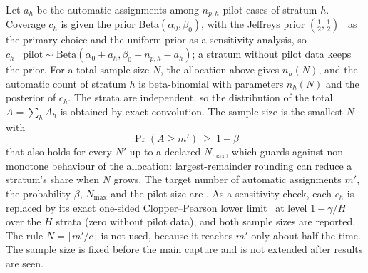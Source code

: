 Let $a_h$ be the automatic assignments among $n_{p,h}$ pilot cases of stratum $h$. Coverage $c_h$ is given the prior Beta$(\alpha_0,\beta_0)$, with the Jeffreys prior $(\tfrac12,\tfrac12)$~\cite{jeffreys1946} as the primary choice and the uniform prior as a sensitivity analysis, so $c_h\mid\text{pilot}\sim\text{Beta}(\alpha_0+a_h,\beta_0+n_{p,h}-a_h)$; a stratum without pilot data keeps the prior. For a total sample size $N$, the allocation above gives $n_h(N)$, and the automatic count of stratum $h$ is beta-binomial with parameters $n_h(N)$ and the posterior of $c_h$. The strata are independent, so the distribution of the total $A=\sum_h A_h$ is obtained by exact convolution. The sample size is the smallest $N$ with
\[
\Pr(A\ge m')\ \ge\ 1-\beta
\]
that also holds for every $N'$ up to a declared $N_{\max}$, which guards against non-monotone behaviour of the allocation: largest-remainder rounding can reduce a stratum's share when $N$ grows. The target number of automatic assignments $m'$, the probability $\beta$, $N_{\max}$ and the pilot size are . As a sensitivity check, each $c_h$ is replaced by its exact one-sided Clopper--Pearson lower limit~\cite{clopper1934} at level $1-\gamma/H$ over the $H$ strata (zero without pilot data), and both sample sizes are reported. The rule $N=\lceil m'/c\rceil$ is not used, because it reaches $m'$ only about half the time. The sample size is fixed before the main capture and is not extended after results are seen.

